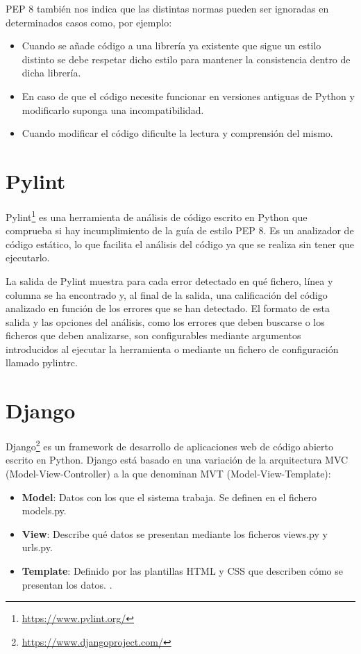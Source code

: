 \documentclass[a4paper, 12pt]{book}
\begin{document}
PEP 8 también nos indica que las distintas normas pueden ser ignoradas en determinados casos como, por ejemplo:
\begin{itemize}
	\item Cuando se añade código a una librería ya existente que sigue un estilo distinto se debe respetar dicho estilo para mantener la consistencia dentro de dicha librería.
	\item En caso de que el código necesite funcionar en versiones antiguas de Python y modificarlo suponga una incompatibilidad.
	\item Cuando modificar el código dificulte la lectura y comprensión del mismo. 
\end{itemize}

\section{Pylint} 
\label{sec:pylint}
Pylint\footnote{\url{https://www.pylint.org/}} es una herramienta de análisis de código escrito en Python que comprueba si hay incumplimiento de la guía de estilo PEP 8. Es un analizador de código estático, lo que facilita el análisis del código ya que se realiza sin tener que ejecutarlo.

La salida de Pylint muestra para cada error detectado en qué fichero, línea y columna se ha encontrado y, al final de la salida, una calificación del código analizado en función de los errores que se han detectado. El formato de esta salida y las opciones del análisis, como los errores que deben buscarse o los ficheros que deben analizarse, son configurables mediante argumentos introducidos al ejecutar la herramienta o mediante un fichero de configuración llamado pylintrc.

\section{Django} 
\label{sec:django}
Django\footnote{\url{https://www.djangoproject.com/}} es un framework de desarrollo de aplicaciones web de código abierto escrito en Python. Django está basado en una variación de la arquitectura MVC (Model-View-Controller) a la que denominan MVT (Model-View-Template):
\begin{itemize}
	\item \textbf{Model}: Datos con los que el sistema trabaja. Se definen en el fichero models.py.
	\item \textbf{View}: Describe qué datos se presentan mediante los ficheros views.py y urls.py. 
	\item \textbf{Template}: Definido por las plantillas HTML y CSS que describen cómo se presentan los datos. .
\end{itemize}
\end{document}
